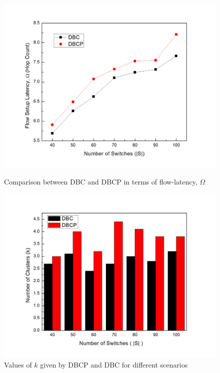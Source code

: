 \documentclass{IEEEtran}
\begin{document}
	\begin{figure}
		\includegraphics[width=\linewidth]{Figures/dbc_vs_dbcp2.jpg}
		\caption{Comparison between DBC and DBCP in terms of flow-latency, $\Omega$}
		\label{fig:dbcVsdbcp2}
		\includegraphics[width=\linewidth]{Figures/bar.jpg}
		\caption{Values of $k$ given by DBCP and DBC for different scenarios}
		\label{fig:barDiagram}
	\end{figure}
\end{document}
